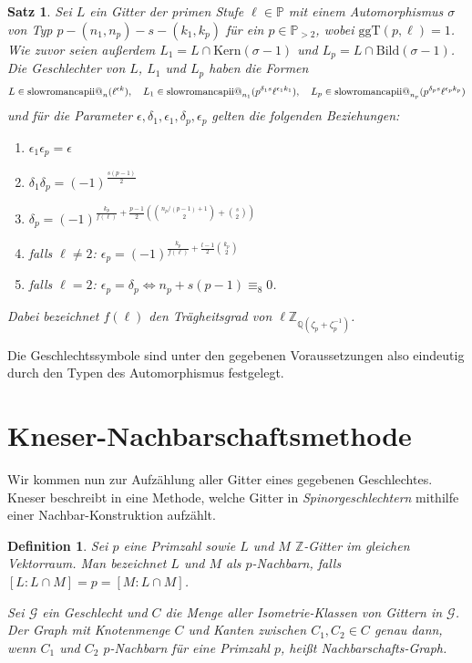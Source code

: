 \documentclass[12pt,a4paper,halfparskip,headsepline,bibtotocnumbered]{scrreprt}
\makeatletter
\theoremstyle{nummermitklammern}
\newtheorem{definition}[defsatzusw]{Definition}
\newtheorem{satz}[defsatzusw]{Satz}
\theoremstyle{nonumberbreak}
\newcommand{\Z}{\mathbb{Z}}
\newcommand{\Q}{\mathbb{Q}}
\renewcommand{\P}{\mathbb{P}}
\newcommand{\ii}{\text{\expandafter\@slowromancap\romannumeral 2@}}
\newcommand{\Kern}{\text{Kern}}
\newcommand{\Bild}{\text{Bild}}
\newcommand{\ggT}{\text{ggT}}
\makeatother
\begin{document}
\begin{framed}
	\begin{satz}
		Sei $L$ ein Gitter der primen Stufe $\ell \in \P$ mit einem Automorphismus $\sigma$ von Typ $p - (n_1, n_p) - s - (k_1, k_p)$ für ein $p \in \P_{> 2}$, wobei $\ggT(p, \ell) = 1$. Wie zuvor seien außerdem $L_1 = L \cap \Kern(\sigma-1)$ und $L_p = L \cap \Bild(\sigma-1)$. Die Geschlechter von $L$, $L_1$ und $L_p$ haben die Formen
		\begin{equation*}
			L \in \ii_n(\ell^{\epsilon k}), \quad L_1 \in \ii_{n_1}(p^{\delta_1 s} \ell^{\epsilon_1 k_1}), \quad L_p \in \ii_{n_p}(p^{\delta_p s} \ell^{\epsilon_p k_p})
		\end{equation*}	
		und für die Parameter $\epsilon, \delta_1, \epsilon_1, \delta_p, \epsilon_p$ gelten die folgenden Beziehungen:
		\begin{enumerate}[label=(\roman*)]
			\item $\epsilon_1 \epsilon_p = \epsilon$
			\item $\delta_1 \delta_p = (-1)^{\frac{s(p-1)}{2}}$
			\item $\delta_p = (-1)^{\frac{k_p}{f(\ell)} + \frac{p-1}{2}\left({n_p / (p-1) +1 \choose 2} + {s \choose 2}\right)}$
			\item falls $\ell \neq 2$: $\epsilon_p = (-1)^{\frac{k_p}{f(\ell)} + \frac{l-1}{2} {k_p \choose 2}}$
			\item falls $\ell = 2$: $\epsilon_p = \delta_p \Leftrightarrow n_p + s(p-1) \equiv_8 0$.
		\end{enumerate}
		Dabei bezeichnet $f(\ell)$ den Trägheitsgrad von $\ell \Z_{\Q(\zeta_p + \zeta_p^{-1})}$.
	\end{satz}
\end{framed}

Die Geschlechtssymbole sind unter den gegebenen Voraussetzungen also eindeutig durch den Typen des Automorphismus festgelegt.

\section{Kneser-Nachbarschaftsmethode}

Wir kommen nun zur Aufzählung aller Gitter eines gegebenen Geschlechtes. Kneser beschreibt in \cite[Abschnitt 28]{kneser} eine Methode, welche Gitter in \textit{Spinorgeschlechtern} mithilfe einer Nachbar-Konstruktion aufzählt.

\begin{framed}
	\begin{definition}
		Sei $p$ eine Primzahl sowie $L$ und $M$ $\Z$-Gitter im gleichen Vektorraum. Man bezeichnet $L$ und $M$ als \textit{$p$-Nachbarn}, falls $\left[ L : L \cap M \right] = p = \left[ M : L \cap M \right]$.\par
		Sei $\mathcal{G}$ ein Geschlecht und $C$ die Menge aller Isometrie-Klassen von Gittern in $\mathcal{G}$. Der Graph mit Knotenmenge $C$ und Kanten zwischen $C_1, C_2 \in C$ genau dann, wenn $C_1$ und $C_2$ $p$-Nachbarn für eine Primzahl $p$, heißt \textit{Nachbarschafts-Graph}.
	\end{definition}
\end{framed}
\end{document}
